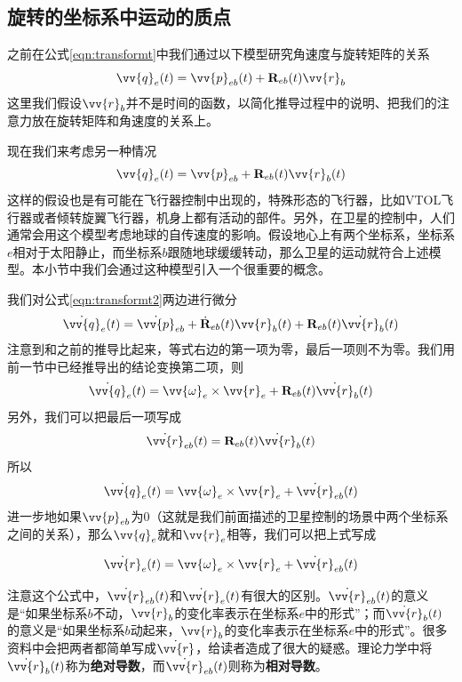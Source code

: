 \documentclass[11pt]{article}
\begin{document}
\subsection{旋转的坐标系中运动的质点}\label{sec:movingcor}
之前在公式\ref{eqn:transformt}中我们通过以下模型研究角速度与旋转矩阵的关系
$$
\vv{q}_{e}(t) = \vv{p}_{eb}(t) + {\bf R}_{eb}(t)\vv{r}_b
$$
这里我们假设$\vv{r}_b$并不是时间的函数，以简化推导过程中的说明、把我们的注意力放在旋转矩阵和角速度的关系上。

现在我们来考虑另一种情况
\begin{equation}\label{eqn:transformt2}
\vv{q}_{e}(t) = \vv{p}_{eb} + {\bf R}_{eb}(t)\vv{r}_b(t)
\end{equation}
这样的假设也是有可能在飞行器控制中出现的，特殊形态的飞行器，比如VTOL飞行器或者倾转旋翼飞行器，机身上都有活动的部件。另外，在卫星的控制中，人们通常会用这个模型考虑地球的自传速度的影响。假设地心上有两个坐标系，坐标系$e$相对于太阳静止，而坐标系$b$跟随地球缓缓转动，那么卫星的运动就符合上述模型。本小节中我们会通过这种模型引入一个很重要的概念。

我们对公式\ref{eqn:transformt2}两边进行微分
\begin{equation*}
\dot{\vv{q}}_{e}(t) = \dot{ \vv{p}}_{eb} + \dot{{\bf R}}_{eb}(t)\vv{r}_b(t) +{\bf R}_{eb}(t)  \dot{\vv{r}}_b(t)
\end{equation*}
注意到和之前的推导比起来，等式右边的第一项为零，最后一项则不为零。我们用前一节中已经推导出的结论变换第二项，则
\begin{equation*}
\dot{\vv{q}}_{e}(t) = \vv{\omega}_e \times \vv{r}_e +{\bf R}_{eb}(t)  \dot{\vv{r}}_b(t)
\end{equation*}
另外，我们可以把最后一项写成
$$
\dot{\vv{r}}_{eb}(t) = {\bf R}_{eb}(t)  \dot{\vv{r}}_b(t)
$$
所以
$$
\dot{\vv{q}}_{e}(t) = \vv{\omega}_e \times \vv{r}_e + \dot{\vv{r}}_{eb}(t)
$$
进一步地如果$\vv{p}_{eb}$为0（这就是我们前面描述的卫星控制的场景中两个坐标系之间的关系），那么$\vv{q}_e$就和$\vv{r}_e$相等，我们可以把上式写成

\begin{equation}\label{eqn:bodyvel}
\dot{\vv{r}}_{e}(t) = \vv{\omega}_e \times \vv{r}_e + \dot{\vv{r}}_{eb}(t)
\end{equation}

注意这个公式中，$\dot{\vv{r}}_{eb}(t)$和$\dot{\vv{r}}_{e}(t)$有很大的区别。$\dot{\vv{r}}_{eb}(t)$的意义是“如果坐标系$b$不动，$\vv{r}_b$的变化率表示在坐标系$e$中的形式”；而$\dot{\vv{r}}_{b}(t)$的意义是“如果坐标系$b$动起来，$\vv{r}_b$的变化率表示在坐标系$e$中的形式”。很多资料中会把两者都简单写成$\dot{\vv{r}}$，给读者造成了很大的疑惑。理论力学中将$\dot{\vv{r}}_{b}(t)$称为\textbf{绝对导数}，而$\dot{\vv{r}}_{eb}(t)$则称为\textbf{相对导数}。
\end{document}
